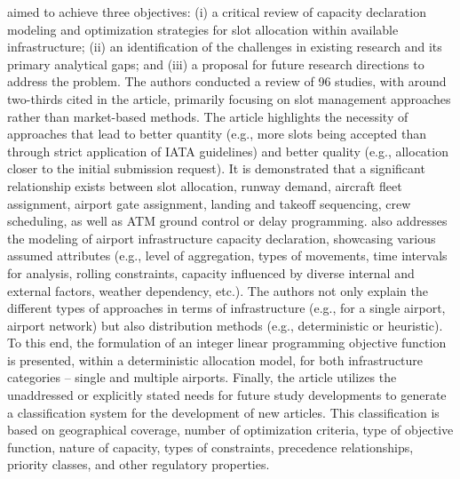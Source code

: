  aimed to achieve three objectives: (i) a critical review of capacity declaration modeling and optimization strategies for slot allocation within available infrastructure; (ii) an identification of the challenges in existing research and its primary analytical gaps; and (iii) a proposal for future research directions to address the problem. The authors conducted a review of 96 studies, with around two-thirds cited in the article, primarily focusing on slot management approaches rather than market-based methods. The article highlights the necessity of approaches that lead to better quantity (e.g., more slots being accepted than through strict application of \acrshort{IATA} guidelines) and better quality (e.g., allocation closer to the initial submission request). It is demonstrated that a significant relationship exists between slot allocation, runway demand, aircraft fleet assignment, airport gate assignment, landing and takeoff sequencing, crew scheduling, as well as \acrshort{ATM} ground control or delay programming.  also addresses the modeling of airport infrastructure capacity declaration, showcasing various assumed attributes (e.g., level of aggregation, types of movements, time intervals for analysis, rolling constraints, capacity influenced by diverse internal and external factors, weather dependency, etc.). The authors not only explain the different types of approaches in terms of infrastructure (e.g., for a single airport, airport network) but also distribution methods (e.g., deterministic or heuristic). To this end, the formulation of an integer linear programming objective function is presented, within a deterministic allocation model, for both infrastructure categories – single and multiple airports. Finally, the article utilizes the unaddressed or explicitly stated needs for future study developments to generate a classification system for the development of new articles. This classification is based on geographical coverage, number of optimization criteria, type of objective function, nature of capacity, types of constraints, precedence relationships, priority classes, and other regulatory properties.


